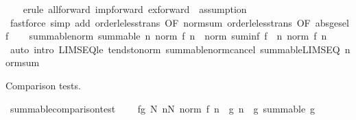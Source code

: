 \begin{isabellebody}
\ \ \isamarkupfalse%
\ {\isacharparenleft}{\kern0pt}erule\ all{\isacharunderscore}{\kern0pt}forward\ imp{\isacharunderscore}{\kern0pt}forward\ ex{\isacharunderscore}{\kern0pt}forward\ {\isacharbar}{\kern0pt}\ assumption{\isacharparenright}{\kern0pt}{\isacharplus}{\kern0pt}\isanewline
\ \ \isamarkupfalse%
\ {\isacharparenleft}{\kern0pt}fastforce\ simp\ add{\isacharcolon}{\kern0pt}\ order{\isacharunderscore}{\kern0pt}le{\isacharunderscore}{\kern0pt}less{\isacharunderscore}{\kern0pt}trans\ {\isacharbrackleft}{\kern0pt}OF\ norm{\isacharunderscore}{\kern0pt}sum{\isacharbrackright}{\kern0pt}\ order{\isacharunderscore}{\kern0pt}le{\isacharunderscore}{\kern0pt}less{\isacharunderscore}{\kern0pt}trans\ {\isacharbrackleft}{\kern0pt}OF\ abs{\isacharunderscore}{\kern0pt}ge{\isacharunderscore}{\kern0pt}self{\isacharbrackright}{\kern0pt}{\isacharparenright}{\kern0pt}\isanewline
\ \ \isamarkupfalse%
%
\endisatagproof
{\isafoldproof}%
%
\isadelimproof
\isanewline
%
\endisadelimproof
\isanewline
{}\isamarkupfalse%
\ summable{\isacharunderscore}{\kern0pt}norm{\isacharcolon}{\kern0pt}\ {\isachardoublequoteopen}summable\ {\isacharparenleft}{\kern0pt}{\isasymlambda}n{\isachardot}{\kern0pt}\ norm\ {\isacharparenleft}{\kern0pt}f\ n{\isacharparenright}{\kern0pt}{\isacharparenright}{\kern0pt}\ {\isasymLongrightarrow}\ norm\ {\isacharparenleft}{\kern0pt}suminf\ f{\isacharparenright}{\kern0pt}\ {\isasymle}\ {\isacharparenleft}{\kern0pt}{\isasymSum}n{\isachardot}{\kern0pt}\ norm\ {\isacharparenleft}{\kern0pt}f\ n{\isacharparenright}{\kern0pt}{\isacharparenright}{\kern0pt}{\isachardoublequoteclose}\isanewline
%
\isadelimproof
\ \ %
\endisadelimproof
%
\isatagproof
{}\isamarkupfalse%
\ {\isacharparenleft}{\kern0pt}auto\ intro{\isacharcolon}{\kern0pt}\ LIMSEQ{\isacharunderscore}{\kern0pt}le\ tendsto{\isacharunderscore}{\kern0pt}norm\ summable{\isacharunderscore}{\kern0pt}norm{\isacharunderscore}{\kern0pt}cancel\ summable{\isacharunderscore}{\kern0pt}LIMSEQ\ norm{\isacharunderscore}{\kern0pt}sum{\isacharparenright}{\kern0pt}%
\endisatagproof
{\isafoldproof}%
%
\isadelimproof
%
\endisadelimproof
%
\begin{isamarkuptext}%
Comparison tests.%
\end{isamarkuptext}\isamarkuptrue%
\isamarkupfalse%
\ summable{\isacharunderscore}{\kern0pt}comparison{\isacharunderscore}{\kern0pt}test{\isacharcolon}{\kern0pt}\ \isanewline
\ \ \ fg{\isacharcolon}{\kern0pt}\ {\isachardoublequoteopen}{\isasymexists}N{\isachardot}{\kern0pt}\ {\isasymforall}n{\isasymge}N{\isachardot}{\kern0pt}\ norm\ {\isacharparenleft}{\kern0pt}f\ n{\isacharparenright}{\kern0pt}\ {\isasymle}\ g\ n{\isachardoublequoteclose}\ \ g{\isacharcolon}{\kern0pt}\ {\isachardoublequoteopen}summable\ g{\isachardoublequoteclose}\isanewline

\end{isabellebody}
